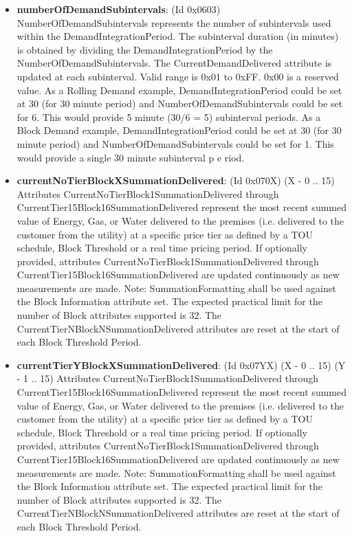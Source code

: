 \begin{itemize}
\item \textbf{numberOfDemandSubintervals}: (Id 0x0603) NumberOfDemandSubintervals represents the number of subintervals used within the DemandIntegrationPeriod. The subinterval duration (in minutes) is obtained by dividing the DemandIntegrationPeriod by the NumberOfDemandSubintervals. The CurrentDemandDelivered attribute is updated at each subinterval. Valid range is 0x01 to 0xFF. 0x00 is a reserved value. As a Rolling Demand example, DemandIntegrationPeriod could be set at 30 (for 30 minute period) and NumberOfDemandSubintervals could be set for 6. This would provide 5 minute (30/6 = 5) subinterval periods. As a Block Demand example, DemandIntegrationPeriod could be set at 30 (for 30 minute period) and NumberOfDemandSubintervals could be set for 1. This would provide a single 30 minute subinterval p e riod.
\item \textbf{currentNoTierBlockXSummationDelivered}: (Id 0x070X) (X - 0 .. 15) Attributes CurrentNoTierBlock1SummationDelivered through CurrentTier15Block16SummationDelivered represent the most recent summed value of Energy, Gas, or Water delivered to the premises (i.e. delivered to the customer from the utility) at a specific price tier as defined by a TOU schedule, Block Threshold or a real time pricing period. If optionally provided, attributes CurrentNoTierBlock1SummationDelivered through CurrentTier15Block16SummationDelivered are updated continuously as new measurements are made. Note: SummationFormatting shall be used against the Block Information attribute set. The expected practical limit for the number of Block attributes supported is 32. The CurrentTierNBlockNSummationDelivered attributes are reset at the start of each Block Threshold Period.
\item \textbf{currentTierYBlockXSummationDelivered}: (Id 0x07YX) (X - 0 .. 15) (Y - 1 .. 15) Attributes CurrentNoTierBlock1SummationDelivered through CurrentTier15Block16SummationDelivered represent the most recent summed value of Energy, Gas, or Water delivered to the premises (i.e. delivered to the customer from the utility) at a specific price tier as defined by a TOU schedule, Block Threshold or a real time pricing period. If optionally provided, attributes CurrentNoTierBlock1SummationDelivered through CurrentTier15Block16SummationDelivered are updated continuously as new measurements are made. Note: SummationFormatting shall be used against the Block Information attribute set. The expected practical limit for the number of Block attributes supported is 32. The CurrentTierNBlockNSummationDelivered attributes are reset at the start of each Block Threshold Period.

\end{itemize}

